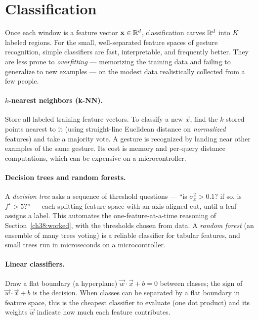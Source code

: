 \section{Classification}
\label{ch38:classification}

Once each window is a feature vector $\mathbf{x} \in \mathbb{R}^d$, classification carves $\mathbb{R}^d$ into $K$ labeled regions. For the small, well-separated feature spaces of gesture recognition, simple classifiers are fast, interpretable, and frequently better. They are less prone to \emph{overfitting} --- memorizing the training data and failing to generalize to new examples --- on the modest data realistically collected from a few people.

\paragraph{$k$-nearest neighbors (k-NN).} Store all labeled training feature vectors. To classify a new $\vec{x}$, find the $k$ stored points nearest to it (using straight-line Euclidean distance on \emph{normalized} features) and take a majority vote. A gesture is recognized by landing near other examples of the same gesture. Its cost is memory and per-query distance computations, which can be expensive on a microcontroller.

\paragraph{Decision trees and random forests.} A \emph{decision tree} asks a sequence of threshold questions --- ``is $\sigma_x^2 > 0.1$? if so, is $f^\star > 5$?'' --- each splitting feature space with an axis-aligned cut, until a leaf assigns a label. This automates the one-feature-at-a-time reasoning of Section~\ref{ch38:worked}, with the thresholds chosen from data. A \emph{random forest} (an ensemble of many trees voting) is a reliable classifier for tabular features, and small trees run in microseconds on a microcontroller.

\paragraph{Linear classifiers.} Draw a flat boundary (a hyperplane) $\vec{w}\cdot\vec{x} + b = 0$ between classes; the sign of $\vec{w}\cdot\vec{x}+b$ is the decision. When classes can be separated by a flat boundary in feature space, this is the cheapest classifier to evaluate (one dot product) and its weights $\vec{w}$ indicate how much each feature contributes.

